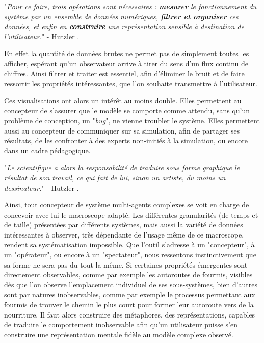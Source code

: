 		"\textit{Pour ce faire, trois opérations sont nécessaires : \textbf{mesurer} le fonctionnement du système par un ensemble de données numériques, \textbf{filtrer et organiser} ces données, et enfin en \textbf{construire} une représentation sensible à destination de l'utilisateur.}" - Hutzler \cite{hutzler_du_2000}.

	En effet la quantité de données brutes ne permet pas de simplement toutes les afficher, espérant qu'un observateur arrive à tirer du sens d'un flux continu de chiffres. Ainsi filtrer et traiter est essentiel, afin d'éliminer le bruit et de faire ressortir les propriétés intéressantes, que l'on souhaite transmettre à l'utilisateur.

		
		 Ces visualisations ont alors un intérêt au moins double. Elles permettent au concepteur de s'assurer que le modèle se comporte comme attendu, sans qu'un problème de conception, un "\textit{bug}", ne vienne troubler le système. Elles permettent aussi au concepteur de communiquer sur sa simulation, afin de partager ses résultats, de les confronter à des experts non-initiés à la simulation, ou encore dans un cadre pédagogique.

		"\textit{Le scientifique a alors la responsabilité de traduire sous forme graphique le résultat de son travail, ce qui fait de lui, sinon un artiste, du moins un dessinateur.}" - Hutzler \cite{hutzler_du_2000}.

	Ainsi, tout concepteur de système multi-agents complexes se voit en charge de concevoir avec lui le macroscope adapté. Les différentes granularités (de temps et de taille) présentées par différents systèmes, mais aussi la variété de données intéressantes à observer, très dépendante de l'usage même de ce macroscope, rendent sa systématisation impossible. Que l'outil s'adresse à un "concepteur", à un "opérateur", ou encore à un "spectateur", nous ressentons instinctivement que sa forme ne sera pas du tout la même. 
	Si certaines propriétés émergentes sont directement observables, comme par exemple les autoroutes de fourmis, visibles dès que l'on observe l'emplacement individuel de ses sous-systèmes, bien d'autres sont par natures inobservables, comme par exemple le processus permettant aux fourmis de trouver le chemin le plus court pour former leur autoroute vers de la nourriture. Il faut alors construire des métaphores, des représentations, capables de traduire le comportement inobservable afin qu'un utilisateur puisse s'en construire une représentation mentale fidèle au modèle complexe observé.

